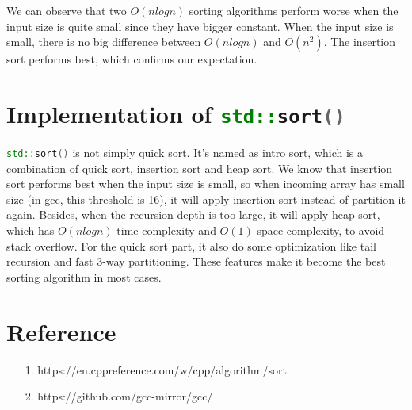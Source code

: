\documentclass[14pt]{article}
\begin{document}
We can observe that two $O(nlogn)$ sorting algorithms perform worse when the input size is quite small since they have bigger constant. When the input size 
is small, there is no big difference between $O(nlogn)$ and $O(n^2)$. The insertion
sort performs best, which confirms our expectation.

\section{Implementation of \lstinline[language=c++]|std::sort()|}
\lstinline[language=c++]|std::sort()| is not simply quick sort. It's named as intro sort, which is a combination of quick sort, 
insertion sort and heap sort. We know that insertion sort performs best when the input size is small, so when incoming array has small size (in gcc, this threshold is 16), 
it will apply insertion sort instead of partition it again. Besides, when the recursion depth is too large, it will apply 
heap sort, which has $O(nlogn)$ time complexity and $O(1)$ space complexity, to avoid stack overflow. For the quick sort 
part, it also do some optimization like tail recursion and fast 3-way partitioning. These features make it become the best sorting 
algorithm in most cases.

\section{Reference}
\begin{itemize}
	\item[1.]
	https://en.cppreference.com/w/cpp/algorithm/sort
	\item[2.]
	https://github.com/gcc-mirror/gcc/
\end{itemize}
\end{document}
